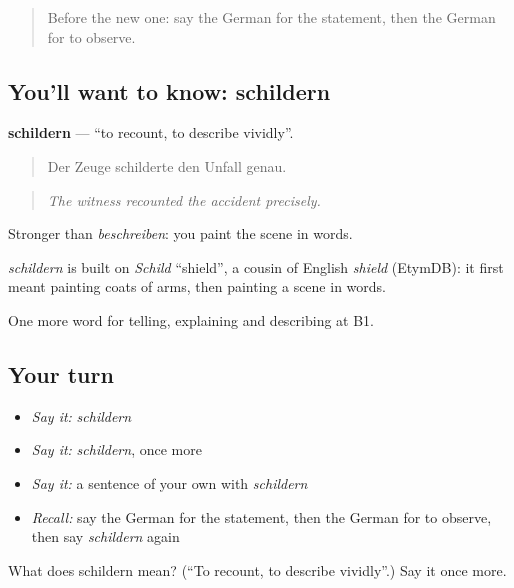 \label{lesson:GE-C283-schildern}



\begin{quote}
Before the new one: say the German for the statement, then the German for to observe.
\end{quote}

\subsection*{You'll want to know: schildern}
\textbf{schildern} — \textquotedblleft{}to recount, to describe vividly\textquotedblright{}.

\begin{quote}
Der Zeuge schilderte den Unfall genau.
\end{quote}

\begin{quote}
\emph{The witness recounted the accident precisely.}
\end{quote}

Stronger than \emph{beschreiben}: you paint the scene in words.

\begin{cousinweb}
\emph{schildern} is built on \emph{Schild} \textquotedblleft{}shield\textquotedblright{}, a cousin of English \emph{shield} (EtymDB): it first meant painting coats of arms, then painting a scene in words.
\end{cousinweb}

\begin{grammarlens}[title={What you've built}]
One more word for telling, explaining and describing at B1.
\end{grammarlens}

\subsection*{Your turn}
\begin{itemize}
\raggedright
  \item \emph{Say it:} \emph{schildern}
  \item \emph{Say it:} \emph{schildern}, once more
  \item \emph{Say it:} a sentence of your own with \emph{schildern}
  \item \emph{Recall:} say the German for the statement, then the German for to observe, then say \emph{schildern} again
\end{itemize}

\begin{tcolorbox}[breakable,colback=teal!4,colframe=teal!35!black,title={Before you move on}]
What does schildern mean? (\textquotedblleft{}To recount, to describe vividly\textquotedblright{}.) Say it once more.
\end{tcolorbox}
